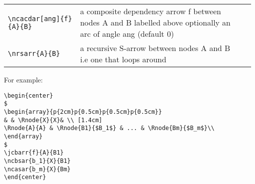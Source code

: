\documentclass[10pt,a4paper]{article}
\begin{document}
\begin{tabular}{|l |  p{5cm} | c |}
			&
			\raisebox{-0.75cm}{$
\begin{array} {c}
\Rnode{A}{A} \\ [0.75cm]
\Rnode{B}{B}
\end{array}$\ncbcdar{f}{A}{B}}
			\\
			\hline
		 	 \verb!\ncacdar[ang]{f}{A}{B}! & a composite dependency arrow f between nodes A and B labelled above optionally an arc of angle ang (default 0)
						&
			\raisebox{-0.75cm}{$
\begin{array} {c}
\Rnode{A}{A} \\ [0.75cm]
\Rnode{B}{B}
\end{array}$\ncacdar{f}{A}{B}}
			\\
		 	 \hline	   
		   \verb!\nrsarr{A}{B}! &  a recursive S-arrow between nodes A and B i.e one that loops around
			&
			\\ 
			\hline		
		\end{tabular}
\vspace{0.5cm}

\noindent For example:
\begin{verbatim}
\begin{center}
$
\begin{array}{p{2cm}p{0.5cm}p{0.5cm}p{0.5cm}}
& & \Rnode{X}{X}& \\ [1.4cm]
\Rnode{A}{A} & \Rnode{B1}{$B_1$} & ... & \Rnode{Bm}{$B_m$}\\
\end{array}
$
\jcbarr{f}{A}{B1}
\ncbsar{b_1}{X}{B1}
\ncasar{b_m}{X}{Bm}
\end{center}
\end{verbatim}
\end{document}
